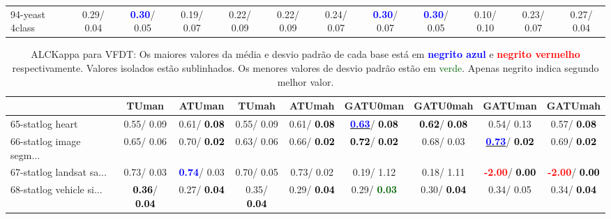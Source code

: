 \begin{table}[h]
\begin{center}
{\begin{tabular}{lc|c|c|c|c|c|c|c|c|c|c}
94-yeast 4class &   0.29/  0.04 & \textcolor{blue}{\textbf{  0.30}}/  0.05 &   0.19/  0.07 &   0.22/  0.09 &   0.22/  0.09 &   0.24/  0.07 & \textcolor{blue}{\textbf{  0.30}}/  0.07 & \textcolor{blue}{\textbf{  0.30}}/  0.05 &   0.10/  0.10 &   0.23/  0.07 &   0.27/  0.04 \\\end{tabular}}\label{stratsALCKappa2aVFDT}
\end{center}
\end{table}
\begin{table}[h]
\caption{ALCKappa para VFDT: Os maiores valores da média e desvio padrão de cada base está em \textcolor{blue}{\textbf{negrito azul}} e \textcolor{red}{\textbf{negrito vermelho}} respectivamente. Valores isolados estão sublinhados. Os menores valores de desvio padrão estão em \textcolor{darkgreen}{verde}. Apenas negrito indica segundo melhor valor.}
\begin{center}\begin{tabular}{lc|c|c|c|c|c|c|c}
 & TUman & \textbf{ATUman} & TUmah & \textbf{ATUmah} & GATU0man & GATU0mah & GATUman & GATUmah\\ \hline 65-statlog heart &   0.55/  0.09 &   0.61/\textcolor{black}{\textbf{  0.08}} &   0.55/  0.09 &   0.61/\textcolor{black}{\textbf{  0.08}} & \underline{\textcolor{blue}{\textbf{  0.63}}}/\textcolor{black}{\textbf{  0.08}} & \textcolor{black}{\textbf{  0.62}}/\textcolor{black}{\textbf{  0.08}} &   0.54/  0.13 &   0.57/\textcolor{black}{\textbf{  0.08}} \\
66-statlog image segm... &   0.65/  0.06 &   0.70/\textcolor{black}{\textbf{  0.02}} &   0.63/  0.06 &   0.66/\textcolor{black}{\textbf{  0.02}} & \textcolor{black}{\textbf{  0.72}}/\textcolor{black}{\textbf{  0.02}} &   0.68/  0.03 & \underline{\textcolor{blue}{\textbf{  0.73}}}/\textcolor{black}{\textbf{  0.02}} &   0.69/\textcolor{black}{\textbf{  0.02}} \\
67-statlog landsat sa... &   0.73/  0.03 & \textcolor{blue}{\textbf{  0.74}}/  0.03 &   0.70/  0.05 &   0.73/  0.02 &   0.19/  1.12 &   0.18/  1.11 & \textcolor{red}{\textbf{ -2.00}}/\textcolor{black}{\textbf{  0.00}} & \textcolor{red}{\textbf{ -2.00}}/\textcolor{black}{\textbf{  0.00}} \\
68-statlog vehicle si... & \textcolor{black}{\textbf{  0.36}}/\textcolor{black}{\textbf{  0.04}} &   0.27/\textcolor{black}{\textbf{  0.04}} &   0.35/\textcolor{black}{\textbf{  0.04}} &   0.29/\textcolor{black}{\textbf{  0.04}} &   0.29/\textcolor{darkgreen}{\textbf{  0.03}} &   0.30/\textcolor{black}{\textbf{  0.04}} &   0.34/  0.05 &   0.34/\textcolor{black}{\textbf{  0.04}} \\

\end{tabular}
\end{center}
\end{table}
